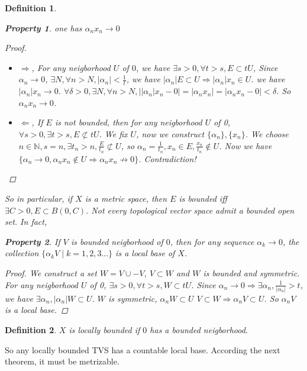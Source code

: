 \documentclass{article}
\newtheorem*{property}{Property}
\newtheorem*{definition}{Definition}
\begin{document}
\begin{definition}
\begin{property}
    one has $\alpha_n x_n \rightarrow 0$
    \begin{proof} \hfill
      \begin{itemize}
        \item $\Rightarrow$, For any neigborhood $U$ of $0$,  
        we have $\exists s > 0, \forall t > s, E \subset tU$,
        Since $\alpha_n \rightarrow 0$, $\exists N, \forall n > N, |\alpha_n| < \frac{1}{t}$,
        we have $|\alpha_n|E \subset U \Rightarrow |\alpha_n|x_n \in U$. we have $|\alpha_n|x_n \rightarrow 0$.
        $\forall \delta > 0, \exists N, \forall n > N, ||\alpha_n|x_n - 0| = |\alpha_n x_n| = |\alpha_n x_n - 0| < \delta$.
        So $\alpha_n x_n \rightarrow 0$.
        \item $\Leftarrow$,
        If $E$ is not bounded, then for any neigborhood $U$ of 0,
        $\forall s > 0, \exists t > s, E \not \subset tU$.
        We fix $U$,
        now we construct $\{\alpha_n\}, \{x_n\}$.
        We choose $n \in \mathbb{N}, s = n, \exists t_n > n, \frac{E}{t_n} \not \subset U$,
        so $\alpha_n = \frac{1}{t_n}, x_n \in E, \frac{x_n}{t_n} \not \in U$.
        Now we have $\{\alpha_n \rightarrow 0, \alpha_n x_n \not \in U \Rightarrow \alpha_n x_n \not \rightarrow 0\}$.
        Contradiction!
      \end{itemize}
    \end{proof}
  \end{property}
  So in particular, if $X$ is a metric space, then $E$ is bounded iff $\exists C > 0, E \subset B(0, C)$.
  Not every topological vector space admit a bounded open set. In fact,
  \begin{property}
    If $V$ is bounded neigborhood of $0$, then for any sequence $\alpha_k \rightarrow 0$, the collection
    $\{\alpha_k V \mid k = 1, 2, 3...\}$ is a local base of $X$.
    \begin{proof}
      We construct a set $W = V \cup -V$, $V \subset W$ and $W$ is bounded and symmetric.
      For any neigborhood $U$ of 0, $\exists s > 0, \forall t > s, W \subset tU$.
      Since $\alpha_n \rightarrow 0 \Rightarrow \exists \alpha_n, \frac{1}{|\alpha_n|} > t$,
      we have $\exists \alpha_n, |\alpha_n| W \subset U$. 
      $W$ is symmetric, $\alpha_n W \subset U$ $V \subset W \Rightarrow \alpha_n V \subset U$.
      So ${\alpha_n V}$ is a local base.
    \end{proof}
  \end{property}
\end{definition}
\begin{definition}
  $X$ is locally bounded if $0$ has a bounded neigborhood.
\end{definition}
So any locally bounded TVS has a countable local base. According the next theorem, it must be metrizable.
\end{document}
